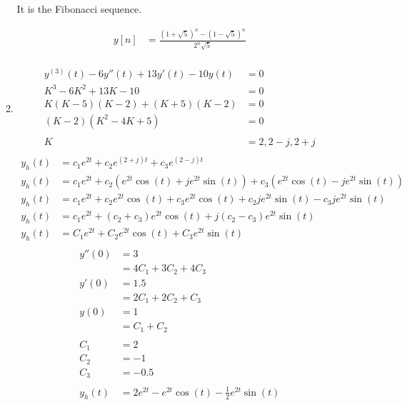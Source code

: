 \documentclass[10pt,a4paper, margin=1in]{article}
\begin{document}
\begin{enumerate}
\begin{enumerate}
    It is the Fibonacci sequence.

    \begin{align*}
        y[n] & = \frac{(1 + \sqrt{5})^n - (1 - \sqrt{5})^n}{2^n \sqrt{5}} \\
    \end{align*}

    \item %
    \begin{align*}
        y^{(3)}(t) - 6y''(t) + 13y'(t) - 10y(t) & = 0\\
        K^3 - 6K^2 + 13K - 10 & = 0\\
        K(K - 5)(K - 2) + (K + 5)(K - 2) & = 0\\
        (K - 2) (K^2 - 4K + 5) & = 0\\
        & \\
        K & = 2, 2 - j, 2 + j \\
    \end{align*}
    \begin{align*}
        y_h(t) & = c_1e^{2t} + c_2e^{(2 + j)t} + c_3e^{(2 - j)t} \\
        y_h(t) & = c_1e^{2t} + c_2\left(e^{2t}\cos(t) + je^{2t}\sin(t)\right) + c_3\left(e^{2t}\cos(t) - je^{2t}\sin(t)\right) \\
        y_h(t) & = c_1e^{2t} + c_2e^{2t}\cos(t) + c_3e^{2t}\cos(t) + c_2je^{2t}\sin(t) - c_3je^{2t}\sin(t) \\
        y_h(t) & = c_1e^{2t} + (c_2 + c_3) e^{2t}\cos(t) + j(c_2 - c_3)e^{2t}\sin(t)\\
        y_h(t) & = C_1e^{2t} + C_2e^{2t}\cos(t) + C_3e^{2t}\sin(t)\\
    \end{align*}
    \begin{align*}
        y''(0) & = 3\\
        & = 4C_1 + 3C_2 + 4C_3\\
        y'(0) & = 1.5\\
        & = 2C_1 + 2C_2 + C_3\\
        y(0) & = 1\\
        & = C_1 + C_2\\
        & \\
        C_1 & = 2\\
        C_2 & = -1\\
        C_3 & = -0.5\\
        & \\
        y_h(t) & = 2e^{2t} - e^{2t}\cos(t) - \frac{1}{2}e^{2t}\sin(t)\\
    \end{align*}
    \end{enumerate}


\end{enumerate}
\end{document}
